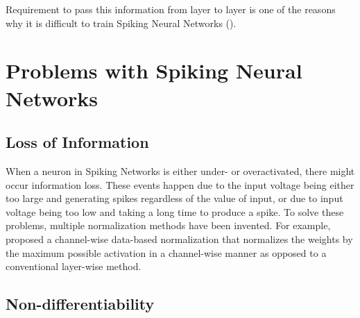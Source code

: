 
Requirement to pass this information from layer to layer is one of the reasons why it is difficult to train Spiking Neural Networks (). 

\section{Problems with Spiking Neural Networks}

\subsection{Loss of Information}

When a neuron in Spiking Networks is either under- or overactivated, there might occur information loss. These events happen due to the input voltage being either too large and generating spikes regardless of the value of input, or due to input voltage being too low and taking a long time to produce a spike. To solve these problems, multiple normalization methods have been invented. For example,  proposed a channel-wise data-based normalization that normalizes the weights by the maximum possible activation in a channel-wise manner as opposed to a conventional layer-wise method. 

\subsection{Non-differentiability}

